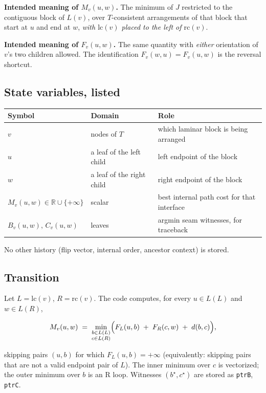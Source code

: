 \documentclass[11pt]{article}
\theoremstyle{plain}
\newcommand{\lc}{\mathrm{lc}}
\newcommand{\rc}{\mathrm{rc}}
\newcommand{\R}{\mathbb{R}}
\begin{document}
\textbf{Intended meaning of \(M_v(u,w)\).} The minimum of \(J\) restricted to
the contiguous block of \(L(v)\), over \(T\)-consistent arrangements of that
block that start at \(u\) and end at \(w\), \emph{with \(\lc(v)\) placed to the
left of \(\rc(v)\)}.

\textbf{Intended meaning of \(F_v(u,w)\).} The same quantity with \emph{either}
orientation of \(v\)'s two children allowed. The identification
\(F_v(w,u) = F_v(u,w)\) is the reversal shortcut.

\subsection{State variables, listed}

\begin{center}
\renewcommand{\arraystretch}{1.3}
\begin{tabular}{@{}l l p{9.5cm}@{}}
\toprule
Symbol & Domain & Role \\
\midrule
\(v\) & nodes of \(T\) & which laminar block is being arranged \\
\(u\) & a leaf of the left child & left endpoint of the block \\
\(w\) & a leaf of the right child & right endpoint of the block \\
\(M_v(u,w) \in \R\cup\{+\infty\}\) & scalar & best internal path cost for that
interface \\
\(B_v(u,w),\,C_v(u,w)\) & leaves & argmin seam witnesses, for traceback \\
\bottomrule
\end{tabular}
\end{center}

No other history (flip vector, internal order, ancestor context) is stored.

\subsection{Transition}

Let \(L = \lc(v)\), \(R = \rc(v)\). The code computes, for every
\(u \in L(L)\) and \(w \in L(R)\),

\begin{equation}
\label{eq:R}
M_v(u,w)
\;=\;
\min_{\substack{b \in L(L)\\ c \in L(R)}}
\Bigl(
F_L(u,b) \;+\; F_R(c,w) \;+\; d(b,c)
\Bigr),
\end{equation}

skipping pairs \((u,b)\) for which \(F_L(u,b) = +\infty\) (equivalently:
skipping pairs that are not a valid endpoint pair of \(L\)). The inner minimum
over \(c\) is vectorized; the outer minimum over \(b\) is an R loop. Witnesses
\((b^\star, c^\star)\) are stored as \texttt{ptrB}, \texttt{ptrC}.
\end{document}
